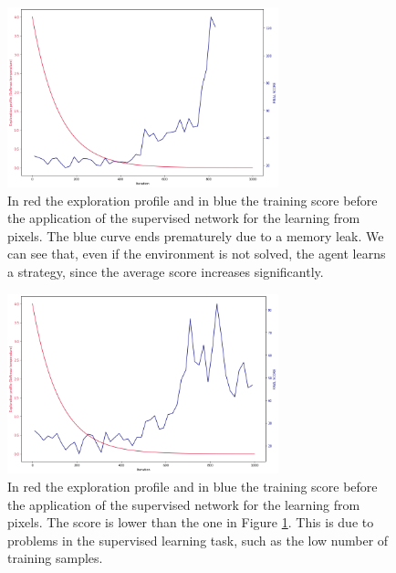 \begin{figure}[h]
    \centering
    \includegraphics[width=0.7\textwidth]{Images/Pix_Prof_Before_trick.png}
    \caption{In red the exploration profile and in blue the training score before the application of the supervised network for the learning
        from pixels. The blue curve ends prematurely due to a memory leak. We can see that, even if the environment is not solved, the agent
        learns a strategy, since the average score increases significantly.}
    \label{fig:bef_trick}
\end{figure}

\begin{figure}[h]
    \centering
    \includegraphics[width=0.7\textwidth]{Images/Pix_Prof_after_trick.png}
    \caption{In red the exploration profile and in blue the training score before the application of the supervised network for the learning
    from pixels. The score is lower than the one in Figure \ref{fig:bef_trick}. This is due to problems in the supervised learning task, such as
    the low number of training samples.}
    \label{fig:aft_trick}
\end{figure}

